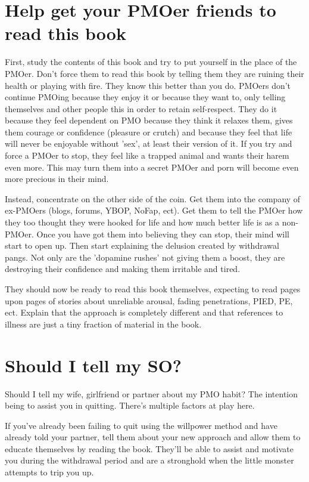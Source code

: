 \documentclass[easypeasy.tex]{subfiles}
\begin{document}
\section{Help get your PMOer friends to read this book}

First, study the contents of this book and try to put yourself in the place of the PMOer. Don't force them to read this book by telling them they are ruining their health or playing with fire. They know this better than you do. PMOers don't continue PMOing because they enjoy it or because they want to, only telling themselves and other people this in order to retain self-respect. They do it because they feel dependent on PMO because they think it relaxes them, gives them courage or confidence (pleasure or crutch) and because they feel that life will never be enjoyable without 'sex', at least their version of it. If you try and force a PMOer to stop, they feel like a trapped animal and wants their harem even more. This may turn them into a secret PMOer and porn will become even more precious in their mind.

Instead, concentrate on the other side of the coin. Get them into the company of ex-PMOers (blogs, forums, YBOP, NoFap, ect). Get them to tell the PMOer how they too thought they were hooked for life and how much better life is as a non-PMOer. Once you have got them into believing they can stop, their mind will start to open up. Then start explaining the delusion created by withdrawal pangs. Not only are the 'dopamine rushes' not giving them a boost, they are destroying their confidence and making them irritable and tired.

They should now be ready to read this book themselves, expecting to read pages upon pages of stories about unreliable arousal, fading penetrations, PIED, PE, ect. Explain that the approach is completely different and that references to illness are just a tiny fraction of material in the book.

\section{Should I tell my SO?}

Should I tell my wife, girlfriend or partner about my PMO habit? The intention being to assist you in quitting. There's multiple factors at play here.

If you've already been failing to quit using the willpower method and have already told your partner, tell them about your new approach and allow them to educate themselves by reading the book. They'll be able to assist and motivate you during the withdrawal period and are a stronghold when the little monster attempts to trip you up. 
\end{document}

